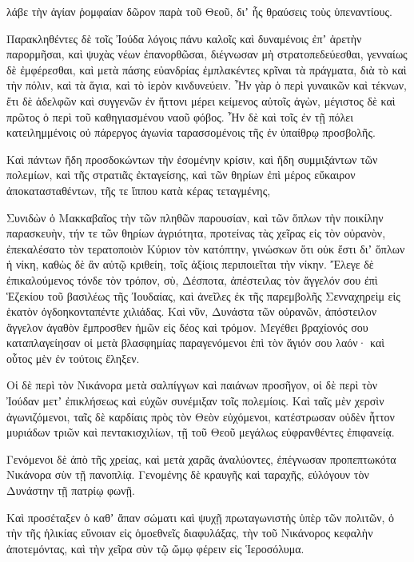 {λάβε τὴν ἁγίαν ῥομφαίαν δῶρον παρὰ τοῦ Θεοῦ, διʼ ἧς θραύσεις τοὺς ὑπεναντίους.
\par }{\PP {}Παρακληθέντες δὲ τοῖς Ἰούδα λόγοις πάνυ καλοῖς καὶ δυναμένοις ἐπʼ ἀρετὴν παρορμῆσαι, καὶ ψυχὰς νέων ἐπανορθῶσαι, διέγνωσαν μὴ στρατοπεδεύεσθαι, γενναίως δὲ ἐμφέρεσθαι, καὶ μετὰ πάσης εὐανδρίας ἐμπλακέντες κρῖναι τὰ πράγματα, διὰ τὸ καὶ τὴν πόλιν, καὶ τὰ ἅγια, καὶ τὸ ἱερὸν κινδυνεύειν.
Ἦν γὰρ ὁ περὶ γυναικῶν καὶ τέκνων, ἔτι δὲ ἀδελφῶν καὶ συγγενῶν ἐν ἥττονι μέρει κείμενος αὐτοῖς ἀγὼν, μέγιστος δὲ καὶ πρῶτος ὁ περὶ τοῦ καθηγιασμένου ναοῦ φόβος.
Ἦν δὲ καὶ τοῖς ἐν τῇ πόλει κατειλημμένοις οὐ πάρεργος ἀγωνία ταρασσομένοις τῆς ἐν ὑπαίθρῳ προσβολῆς.
\par }{\PP {}Καὶ πάντων ἤδη προσδοκώντων τὴν ἐσομένην κρίσιν, καὶ ἤδη συμμιξάντων τῶν πολεμίων, καὶ τῆς στρατιᾶς ἐκταγείσης, καὶ τῶν θηρίων ἐπὶ μέρος εὔκαιρον ἀποκατασταθέντων, τῆς τε ἵππου κατὰ κέρας τεταγμένης,
\par }{\PP {}Συνιδὼν ὁ Μακκαβαῖος τὴν τῶν πληθῶν παρουσίαν, καὶ τῶν ὅπλων τὴν ποικίλην παρασκευὴν, τήν τε τῶν θηρίων ἀγριότητα, προτείνας τὰς χεῖρας εἰς τὸν οὐρανὸν, ἐπεκαλέσατο τὸν τερατοποιὸν Κύριον τὸν κατόπτην, γινώσκων ὅτι οὐκ ἔστι διʼ ὅπλων ἡ νίκη, καθὼς δὲ ἂν αὐτῷ κριθείη, τοῖς ἀξίοις περιποιεῖται τὴν νίκην.
Ἔλεγε δὲ ἐπικαλούμενος τόνδε τὸν τρόπον, σὺ, Δέσποτα, ἀπέστειλας τὸν ἄγγελόν σου ἐπὶ Ἑζεκίου τοῦ βασιλέως τῆς Ἰουδαίας, καὶ ἀνεῖλες ἐκ τῆς παρεμβολῆς Σενναχηρεὶμ εἰς ἑκατὸν ὀγδοηκονταπέντε χιλιάδας.
Καὶ νῦν, Δυνάστα τῶν οὐρανῶν, ἀπόστειλον ἄγγελον ἀγαθὸν ἔμπροσθεν ἡμῶν εἰς δέος καὶ τρόμον.
Μεγέθει βραχίονός σου καταπλαγείησαν οἱ μετὰ βλασφημίας παραγενόμενοι ἐπὶ τὸν ἅγιόν σου λαόν· καὶ οὗτος μὲν ἐν τούτοις ἔληξεν.
\par }{\PP {}Οἱ δὲ περὶ τὸν Νικάνορα μετὰ σαλπίγγων καὶ παιάνων προσῆγον,
οἱ δὲ περὶ τὸν Ἰούδαν μετʼ ἐπικλήσεως καὶ εὐχῶν συνέμιξαν τοῖς πολεμίοις.
Καὶ ταῖς μὲν χερσὶν ἀγωνιζόμενοι, ταῖς δὲ καρδίαις πρὸς τὸν Θεὸν εὐχόμενοι, κατέστρωσαν οὐδὲν ἧττον μυριάδων τριῶν καὶ πεντακισχιλίων, τῇ τοῦ Θεοῦ μεγάλως εὐφρανθέντες ἐπιφανείᾳ.
\par }{\PP {}Γενόμενοι δὲ ἀπὸ τῆς χρείας, καὶ μετὰ χαρᾶς ἀναλύοντες, ἐπέγνωσαν προπεπτωκότα Νικάνορα σὺν τῇ πανοπλίᾳ.
Γενομένης δὲ κραυγῆς καὶ ταραχῆς, εὐλόγουν τὸν Δυνάστην τῇ πατρίῳ φωνῇ.
\par }{\PP {}Καὶ προσέταξεν ὁ καθʼ ἅπαν σώματι καὶ ψυχῇ πρωταγωνιστὴς ὑπὲρ τῶν πολιτῶν, ὁ τὴν τῆς ἡλικίας εὔνοιαν εἰς ὁμοεθνεῖς διαφυλάξας, τὴν τοῦ Νικάνορος κεφαλὴν ἀποτεμόντας, καὶ τὴν χεῖρα σὺν τῷ ὤμῳ φέρειν εἰς Ἱεροσόλυμα.
}
